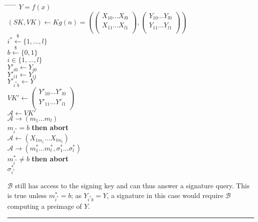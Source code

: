 \documentclass[twoside]{article}
\newenvironment{proof}{{\bf Proof:}}{\hfill\rule{2mm}{2mm}}
\begin{document}
\begin{proof}
\begin{tabbing}
\hspace*{.25in} \= \hspace*{.25in} \= \hspace*{.25in} \= \hspace*{.25in} \= \hspace*{.25in} \=\kill
{} $Y = f(x)$\\
\>$(SK, VK) \leftarrow Kg(n) = \left(
\begin{pmatrix}
X_{10}...X_{l0}\\
X_{11}...X_{l1}\\
\end{pmatrix},
\begin{pmatrix}
Y_{10}...Y_{l0}\\
Y_{11}...Y_{l1}\\
\end{pmatrix}\right)$\\
\>$i^* \xleftarrow{\$} \{1,...,l\} $\\
\>$b \xleftarrow{\$} \{0,1\}$\\
 $i \in \{1,...,l\}$\\
\>\>$Y'_{i0} \leftarrow Y_{i0}$\\
\>\>$Y'_{i1} \leftarrow Y_{i1}$\\
\>$Y'_{i^*b} \leftarrow Y$\\
\>$VK' \leftarrow
\begin{pmatrix}
Y'_{10}...Y'_{l0}\\
Y'_{11}...Y'_{l1}\\
\end{pmatrix}$\\
\>$\mathcal{A} \leftarrow VK'$\\
\>$\mathcal{A} \rightarrow (m_1...m_l)$\\
 $m_{i^*} = b$ {\bf then abort}\\
\>$\mathcal{A} \leftarrow (X_{1m_1}...X_{lm_l})$\\
\>$\mathcal{A} \rightarrow (m^*_1...m^*_l,\sigma^*_1...\sigma^*_l)$\\
 $m^*_{i^*} \neq b$ {\bf then abort}\\
 $\sigma^*_{i^*}$
\end{tabbing}

$\mathcal{B}$ still has access to the signing key and can thus answer a signature query. This is true unless $m^*_{i^*} = b$; as $Y_{i^*b} = Y$, a signature in this case would require $\mathcal{B}$ computing a preimage of $Y$.


\end{proof}
\end{document}
